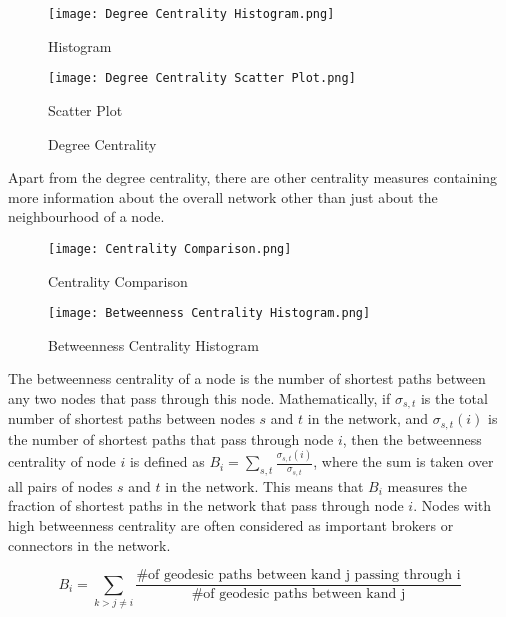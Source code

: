 \begin{figure}[H]
    \centering
    \begin{minipage}{0.49\textwidth}
    \centering
    \texttt{[image: Degree Centrality Histogram.png]}
    \caption{Histogram}\label{fig:Degree Centrality Histogram}
    \end{minipage}
    \centering
    \begin{minipage}{0.49\textwidth}
    \centering
    \texttt{[image: Degree Centrality Scatter Plot.png]}
    \caption{Scatter Plot}\label{fig:Degree Centrality Scatter Plot}
    \end{minipage}
    \caption{Degree Centrality}
\end{figure}

Apart from the degree centrality, there are other centrality measures containing more information about the overall network other than just about the neighbourhood of a node.
\begin{figure}[H]
    \centering
    \begin{minipage}{0.49\textwidth}
    \centering
    \texttt{[image: Centrality Comparison.png]}
    \caption{Centrality Comparison}\label{fig:Centrality Comparison}
    \end{minipage}
    \centering
    \begin{minipage}{0.49\textwidth}
    \centering
    \texttt{[image: Betweenness Centrality Histogram.png]}
    \caption{Betweenness Centrality Histogram}\label{fig:Betweenness Centrality Histogram}
    \end{minipage}
\end{figure}


The betweenness centrality of a node is the number of shortest paths between any two nodes that pass through this node. Mathematically, if $\sigma_{s,t}$ is the total number of shortest paths between nodes $s$ and $t$ in the network, and $\sigma_{s,t}(i)$ is the number of shortest paths that pass through node $i$, then the betweenness centrality of node $i$ is defined as $B_i = \sum_{s,t} \frac{\sigma_{s,t}(i)}{\sigma_{s,t}}$, where the sum is taken over all pairs of nodes $s$ and $t$ in the network. This means that $B_i$ measures the fraction of shortest paths in the network that pass through node $i$. Nodes with high betweenness centrality are often considered as important brokers or connectors in the network.

\[
    B_i = \sum_{k > j\neq i}\frac{\text{\# of geodesic paths between kand j passing through i}}{\text{\# of geodesic paths between kand j}}
\]

